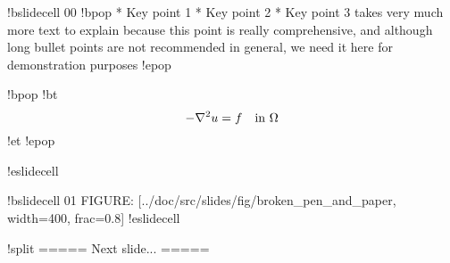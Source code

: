 \documentclass[%
oneside,                 %
final,                   %
10pt]{article}
\begin{document}
!bslidecell 00
!bpop
 * Key point 1
 * Key point 2
 * Key point 3 takes very much more text to explain because
   this point is really comprehensive, and although long
   bullet points are not recommended in general, we need
   it here for demonstration purposes
!epop

!bpop
!bt
\[ -\nabla^2 u = f \quad\hbox{in }\Omega \]
!et
!epop

!eslidecell

!bslidecell 01
FIGURE: [../doc/src/slides/fig/broken_pen_and_paper, width=400, frac=0.8]
!eslidecell

!split
===== Next slide... =====

\eccq

\cleardoublepage{}  %
\printindex
\end{document}
